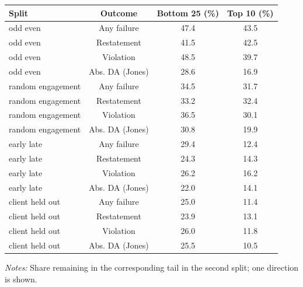 \documentclass[10pt]{article}
\begin{document}
\begin{minipage}{19cm}\fontsize{10}{12}\selectfont\setlength{\tabcolsep}{4pt}\renewcommand{\arraystretch}{1.12}


\centering
{}
\begin{threeparttable}
\begin{tabular}{p{}ccc}
\toprule
Split & Outcome & Bottom 25 (\%) & Top 10 (\%) \\
\midrule
odd even & Any failure & 47.4 & 43.5 \\
odd even & Restatement & 41.5 & 42.5 \\
odd even & Violation & 48.5 & 39.7 \\
odd even & Abs. DA (Jones) & 28.6 & 16.9 \\
random engagement & Any failure & 34.5 & 31.7 \\
random engagement & Restatement & 33.2 & 32.4 \\
random engagement & Violation & 36.5 & 30.1 \\
random engagement & Abs. DA (Jones) & 30.8 & 19.9 \\
early late & Any failure & 29.4 & 12.4 \\
early late & Restatement & 24.3 & 14.3 \\
early late & Violation & 26.2 & 16.2 \\
early late & Abs. DA (Jones) & 22.0 & 14.1 \\
client held out & Any failure & 25.0 & 11.4 \\
client held out & Restatement & 23.9 & 13.1 \\
client held out & Violation & 26.0 & 11.8 \\
client held out & Abs. DA (Jones) & 25.5 & 10.5 \\
\bottomrule
\end{tabular}
\begin{tablenotes}\fontsize{9}{11}\selectfont
\item \raggedright \fontsize{9}{11}\selectfont \textit{Notes:} Share remaining in the corresponding tail in the second split; one direction is shown.
\end{tablenotes}
\end{threeparttable}

\end{minipage}
\end{document}
